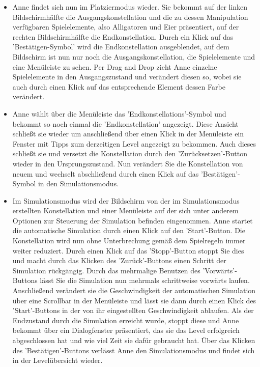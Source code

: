 \begin{requirements}
\begin{itemize}
  			\item Anne findet sich nun im Platziermodus wieder. Sie bekommt auf der linken Bildschirmhälfte die Ausgangskonstellation und die zu dessen Manipulation verfügbaren Spielelemente, also Alligatoren und Eier präsentiert, auf der rechten Bildschirmhälfte die Endkonstellation. Durch ein Klick auf das 'Bestätigen-Symbol' wird die Endkonstellation ausgeblendet, auf dem Bildschirm ist nun nur noch die Ausgangskonstellation, die Spielelemente und eine Menüleiste zu sehen. Per Drag and Drop zieht Anne einzelne Spielelemente in den Ausgangszustand und verändert diesen so, wobei sie auch durch einen Klick auf das entsprechende Element dessen Farbe verändert.
  			
  			\item Anne wählt über die Menüleiste das 'Endkonstellations'-Symbol und bekommt so noch einmal die 'Endkonstellation' angezeigt. Diese Ansicht schließt sie wieder um anschließend über einen Klick in der Menüleiste ein Fenster mit Tipps zum derzeitigen Level angezeigt zu bekommen. Auch dieses schließt sie und versetzt die Konstellation durch den 'Zurücksetzen'-Button wieder in den Ursprungszustand. Nun verändert Sie die Konstellation von neuem und wechselt abschließend durch einen Klick auf das 'Bestätigen'-Symbol in den Simulationsmodus.
  			
  			\item Im Simulationsmodus wird der Bildschirm von der im Simulationsmodus erstellten Konstellation und einer Menüleiste auf der sich unter anderem Optionen zur Steuerung der Simulation befinden eingenommen. Anne startet die automatische Simulation durch einen Klick auf den 'Start'-Button. Die Konstellation wird nun ohne Unterbrechung gemäß dem Spielregeln immer weiter reduziert. Durch einen Klick auf das 'Stopp'-Button stoppt Sie dies und macht durch das Klicken des 'Zurück'-Buttons einen Schritt der Simulation rückgängig. Durch das mehrmalige Benutzen des 'Vorwärts'-Buttons lässt Sie die Simulation nun mehrmals schrittweise vorwärts laufen. Anschließend verändert sie die Geschwindigkeit der automatischen Simulation über eine Scrollbar in der Menüleiste und lässt sie dann durch einen Klick des 'Start'-Buttons in der von ihr eingestellten Geschwindigkeit ablaufen. Als der Endzustand durch die Simulation erreicht wurde, stoppt diese und Anne bekommt über ein Dialogfenster präsentiert, das sie das Level erfolgreich abgeschlossen hat und wie viel Zeit sie dafür gebraucht hat. Über das Klicken des 'Bestätigen'-Buttons verlässt Anne den Simulationsmodus und findet sich in der Levelübersicht wieder.
  			

\end{itemize}
\end{requirements}
